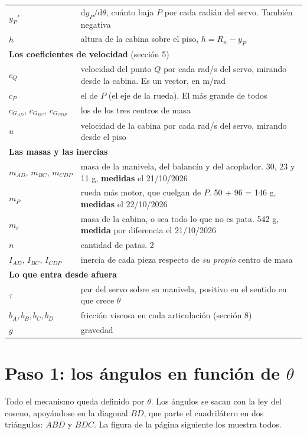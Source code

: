 \documentclass[11pt,a4paper]{article}
\newcommand{\dd}{\mathrm{d}}
\begin{document}
{\begin{longtable}{l p{11.4cm}}
\(y_P'\) & \(\dd y_P/\dd\theta\), cuánto baja \(P\) por cada radián del servo. También negativa \\
\(h\) & altura de la cabina sobre el piso, \(h=R_w-y_P\) \\
\midrule
\multicolumn{2}{l}{\textbf{Los coeficientes de velocidad} (sección 5)}\\
\midrule
\(c_Q\) & velocidad del punto \(Q\) por cada rad/s del servo, mirando desde la cabina. Es un vector, en m/rad \\
\(c_P\) & el de \(P\) (el eje de la rueda). El más grande de todos \\
\(c_{G_{AD}},\,c_{G_{BC}},\,c_{G_{CDP}}\) & los de los tres centros de masa \\
\(u\) & velocidad de la cabina por cada rad/s del servo, mirando desde el piso \\
\midrule
\multicolumn{2}{l}{\textbf{Las masas y las inercias}}\\
\midrule
\(m_{AD},\,m_{BC},\,m_{CDP}\) & masa de la manivela, del balancín y del acoplador. 30, 23 y 11 g, \textbf{medidas} el 21/10/2026 \\
\(m_P\) & rueda más motor, que cuelgan de \(P\). 50 + 96 = 146 g, \textbf{medidas} el 22/10/2026 \\
\(m_c\) & masa de la cabina, o sea todo lo que no es pata. 542 g, \textbf{medida} por diferencia el 21/10/2026 \\
\(n\) & cantidad de patas. 2 \\
\(I_{AD},\,I_{BC},\,I_{CDP}\) & inercia de cada pieza respecto de \emph{su propio} centro de masa \\
\midrule
\multicolumn{2}{l}{\textbf{Lo que entra desde afuera}}\\
\midrule
\(\tau\) & par del servo sobre su manivela, positivo en el sentido en que crece \(\theta\) \\
\(b_A,b_B,b_C,b_D\) & fricción viscosa en cada articulación (sección 8) \\
\(g\) & gravedad \\
\bottomrule
\end{longtable}}

\section{Paso 1: los ángulos en función de \(\theta\)}

Todo el mecanismo queda definido por \(\theta\). Los ángulos se sacan con la ley del coseno, apoyándose en la
diagonal \(BD\), que parte el cuadrilátero en dos triángulos: \(ABD\) y \(BDC\). La figura de la página
siguiente los muestra todos.
\end{document}
